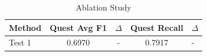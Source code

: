 
\begin{table}[h]
\centering
\caption{Ablation Study}
\label{tab:ablation}
\begin{tabular}{lccc}
\toprule
Method & Quest Avg F1 & $\Delta$ & Quest Recall & $\Delta$ \\
\midrule
Test 1 & 0.6970 & - & 0.7917 & - \\
\bottomrule
\end{tabular}
\end{table}
